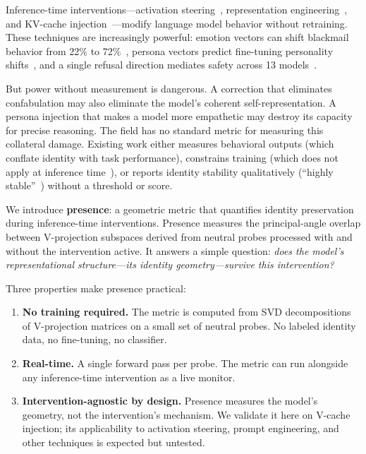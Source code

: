 \documentclass[11pt,a4paper]{article}
\begin{document}
Inference-time interventions---activation steering~\citep{turner2024steering},
representation engineering~\citep{zou2023representation}, and KV-cache
injection~\citep{pustovit2026knowledge}---modify language model behavior
without retraining. These techniques are increasingly powerful: emotion vectors
can shift blackmail behavior from 22\% to 72\%~\citep{anthropic2026emotion},
persona vectors predict fine-tuning personality shifts~\citep{chen2025persona},
and a single refusal direction mediates safety across 13
models~\citep{arditi2024refusal}.

But power without measurement is dangerous. A correction that eliminates
confabulation may also eliminate the model's coherent self-representation.
A persona injection that makes a model more empathetic may destroy its
capacity for precise reasoning. The field has no standard metric for
measuring this collateral damage. Existing work either measures behavioral
outputs (which conflate identity with task performance), constrains training
(which does not apply at inference time~\citep{zhang2025guardspace}), or
reports identity stability qualitatively (``highly
stable''~\citep{aneja2026intrinsic}) without a threshold or score.

We introduce \textbf{presence}: a geometric metric that quantifies identity
preservation during inference-time interventions. Presence measures the
principal-angle overlap between V-projection subspaces derived from neutral
probes processed with and without the intervention active. It answers a
simple question: \emph{does the model's representational structure---its
identity geometry---survive this intervention?}

Three properties make presence practical:
\begin{enumerate}[nosep]
  \item \textbf{No training required.} The metric is computed from SVD
    decompositions of V-projection matrices on a small set of neutral probes.
    No labeled identity data, no fine-tuning, no classifier.
  \item \textbf{Real-time.} A single forward pass per probe. The metric can
    run alongside any inference-time intervention as a live monitor.
  \item \textbf{Intervention-agnostic by design.} Presence measures the
    model's geometry, not the intervention's mechanism. We validate it here
    on V-cache injection; its applicability to activation steering, prompt
    engineering, and other techniques is expected but untested.
\end{enumerate}
\end{document}
